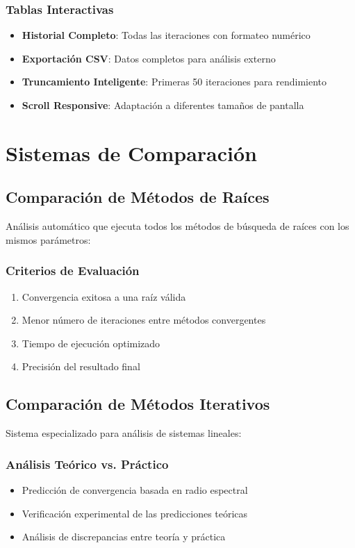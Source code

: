 \subsubsection{Tablas Interactivas}
\begin{itemize}
    \item \textbf{Historial Completo}: Todas las iteraciones con formateo numérico
    \item \textbf{Exportación CSV}: Datos completos para análisis externo
    \item \textbf{Truncamiento Inteligente}: Primeras 50 iteraciones para rendimiento
    \item \textbf{Scroll Responsive}: Adaptación a diferentes tamaños de pantalla
\end{itemize}

\section{Sistemas de Comparación}

\subsection{Comparación de Métodos de Raíces}

Análisis automático que ejecuta todos los métodos de búsqueda de raíces con los mismos parámetros:

\subsubsection{Criterios de Evaluación}
\begin{enumerate}
    \item Convergencia exitosa a una raíz válida
    \item Menor número de iteraciones entre métodos convergentes
    \item Tiempo de ejecución optimizado
    \item Precisión del resultado final
\end{enumerate}

\subsection{Comparación de Métodos Iterativos}

Sistema especializado para análisis de sistemas lineales:

\subsubsection{Análisis Teórico vs. Práctico}
\begin{itemize}
    \item Predicción de convergencia basada en radio espectral
    \item Verificación experimental de las predicciones teóricas
    \item Análisis de discrepancias entre teoría y práctica
\end{itemize}

